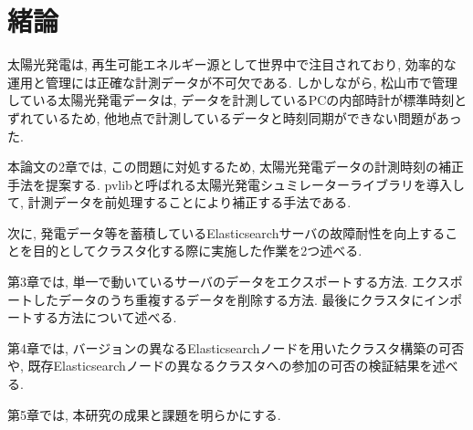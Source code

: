 \chapter{緒論}
\label{chap:first}

太陽光発電は, 再生可能エネルギー源として世界中で注目されており, 効率的な運用と管理には正確な計測データが不可欠である. しかしながら, 松山市で管理している太陽光発電データは, データを計測しているPCの内部時計が標準時刻とずれているため, 他地点で計測しているデータと時刻同期ができない問題があった.

本論文の2章では, この問題に対処するため, 太陽光発電データの計測時刻の補正手法を提案する. pvlibと呼ばれる太陽光発電シュミレーターライブラリを導入して, 計測データを前処理することにより補正する手法である.

次に, 発電データ等を蓄積しているElasticsearchサーバの故障耐性を向上することを目的としてクラスタ化する際に実施した作業を2つ述べる.

第3章では, 単一で動いているサーバのデータをエクスポートする方法. エクスポートしたデータのうち重複するデータを削除する方法. 最後にクラスタにインポートする方法について述べる.

第4章では, バージョンの異なるElasticsearchノードを用いたクラスタ構築の可否や, 既存Elasticsearchノードの異なるクラスタへの参加の可否の検証結果を述べる. 

第5章では, 本研究の成果と課題を明らかにする.